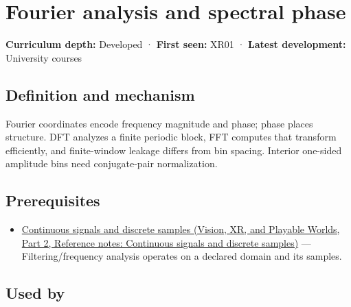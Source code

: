 \hypertarget{appendix-b60686ba06a1}{}\label{referencestart:appendix-b60686ba06a1}
\section{Fourier analysis and spectral phase}\label{appendix-b60686ba06a1-fourier-analysis-and-spectral-phase}

\hypertarget{appendix-b60686ba06a1-fourier-analysis-and-spectral-phase}{}

\textbf{Curriculum depth:} Developed · \textbf{First seen:} XR01 · \textbf{Latest development:} University courses

\begin{allmightroledefinition}

\subsection{Definition and mechanism}\label{appendix-b60686ba06a1-definition-and-mechanism}

\hypertarget{appendix-b60686ba06a1-definition-and-mechanism}{}

Fourier coordinates encode frequency magnitude and phase; phase places structure. DFT analyzes a finite periodic block, FFT computes that transform efficiently, and finite-window leakage differs from bin spacing. Interior one-sided amplitude bins need conjugate-pair normalization.

\end{allmightroledefinition}

\subsection{Prerequisites}\label{appendix-b60686ba06a1-prerequisites}

\hypertarget{appendix-b60686ba06a1-prerequisites}{}

\begin{itemize}
\tightlist
\item
  \href{../07-Vision-XR-and-Playable-Worlds-P02/main.pdf\#appendix-1077ea8fc737}{Continuous signals and discrete samples (Vision, XR, and Playable Worlds, Part 2, Reference notes: Continuous signals and discrete samples)} --- Filtering/frequency analysis operates on a declared domain and its samples.
\end{itemize}

\subsection{Used by}\label{appendix-b60686ba06a1-used-by}

